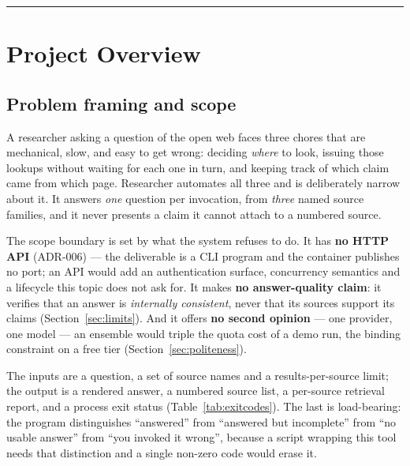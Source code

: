 \documentclass[10pt,a4paper]{article}
\begin{document}
\setcounter{tocdepth}{1}
\vspace{0.2em}
\tableofcontents
\vspace{0.3em}\hrule\vspace{0.3em}

\section{Project Overview}

\subsection{Problem framing and scope}

A researcher asking a question of the open web faces three chores that are mechanical, slow, and
easy to get wrong: deciding \emph{where} to look, issuing those lookups without waiting for each
one in turn, and keeping track of which claim came from which page. Researcher automates all
three and is deliberately narrow about it. It answers \emph{one} question per invocation, from
\emph{three} named source families, and it never presents a claim it cannot attach to a numbered
source.

The scope boundary is set by what the system refuses to do. It has \textbf{no HTTP API} (ADR-006)
--- the deliverable is a CLI program and the container publishes no port; an API would add an
authentication surface, concurrency semantics and a lifecycle this topic does not ask for. It
makes \textbf{no answer-quality claim}: it verifies that an answer is \emph{internally
consistent}, never that its sources
support its claims (Section~\ref{sec:limits}). And it offers \textbf{no second opinion} --- one
provider, one model --- an ensemble would triple the quota cost of a demo run, the binding
constraint on a free tier (Section~\ref{sec:politeness}).

The inputs are a question, a set of source names and a results-per-source limit; the output is a
rendered answer, a numbered source list, a per-source retrieval report, and a process exit status
(Table~\ref{tab:exitcodes}). The last is load-bearing: the program distinguishes ``answered'' from
``answered but incomplete'' from ``no usable answer'' from ``you invoked it wrong'', because a
script wrapping this tool needs that distinction and a single non-zero code would erase it.
\end{document}
